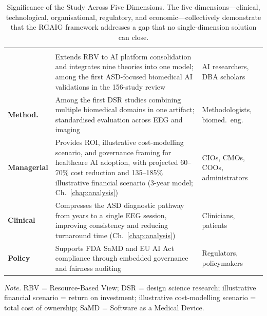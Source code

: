 {\tablestripes\tablefontsize
\begin{xltabular}{\textwidth}{@{} >{\raggedright\arraybackslash}p{1.7cm} X >{\raggedright\arraybackslash}p{2.5cm} @{}}
\caption[Significance of the Study Across Five Dimensions]{Significance of the Study Across Five Dimensions. The five dimensions---clinical, technological, organisational, regulatory, and economic---collectively demonstrate that the RGAIG framework addresses a gap that no single-dimension solution can close.}\label{tab:significance} \\
\toprule
{} &  &  \\
\midrule
\endfirsthead
\toprule
{} &  &  \\
\midrule
\endhead
\bottomrule
\endlastfoot
{} & Extends RBV to AI platform consolidation and integrates nine theories into one model; among the first ASD-focused biomedical AI validations in the 156-study review & AI researchers, DBA scholars \\
\addlinespace
\textbf{Method.} & Among the first DSR studies combining multiple biomedical domains in one artifact; standardised evaluation across EEG and imaging & Methodologists, biomed.\ eng. \\
\addlinespace
\textbf{Managerial} & Provides ROI, illustrative cost-modelling scenario, and governance framing for healthcare AI adoption, with projected 60--70\% cost reduction and 135--185\% illustrative financial scenario (3-year model; Ch.~\ref{chap:analysis}) & CIOs, CMOs, COOs, administrators \\
\addlinespace
\textbf{Clinical} & Compresses the ASD diagnostic pathway from years to a single EEG session, improving consistency and reducing turnaround time (Ch.~\ref{chap:analysis}) & Clinicians, patients \\
\addlinespace
\textbf{Policy} & Supports FDA SaMD and EU AI Act compliance through embedded governance and fairness auditing & Regulators, policymakers \\
\end{xltabular}}
\vspace{0.5em}
\noindent\textit{Note.} RBV = Resource-Based View; DSR = design science research; illustrative financial scenario = return on investment; illustrative cost-modelling scenario = total cost of ownership; SaMD = Software as a Medical Device.

